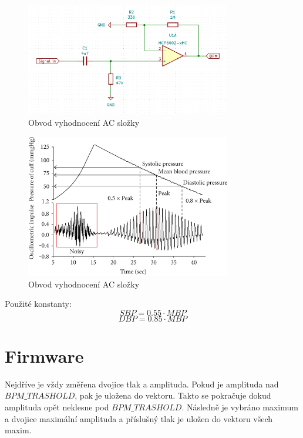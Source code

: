 \documentclass[a4paper,10pt]{article}
\begin{document}
\begin{figure}[H]
\centering
\includegraphics[width=0.8\textwidth]{ac}
\caption{Obvod vyhodnocení AC složky}
\end{figure}
\begin{figure}[H]
\centering
\includegraphics[width=0.8\textwidth]{method}
\caption{Obvod vyhodnocení AC složky}
\end{figure}

Použité konstanty:
\begin{equation}
 SBP = 0.55 \cdot MBP
\end{equation}
\begin{equation}
 DBP = 0.85 \cdot MBP
\end{equation}

\section{Firmware}

Nejdříve je vždy změřena dvojice tlak a amplituda. Pokud je amplituda nad $BPM\_TRASHOLD$, pak je uložena do vektoru. Takto se pokračuje dokud amplituda opět neklesne pod $BPM\_TRASHOLD$. Následně je vybráno maximum a dvojice maximální amplituda a příslušný tlak je uložen do vektoru všech maxim.
\end{document}
